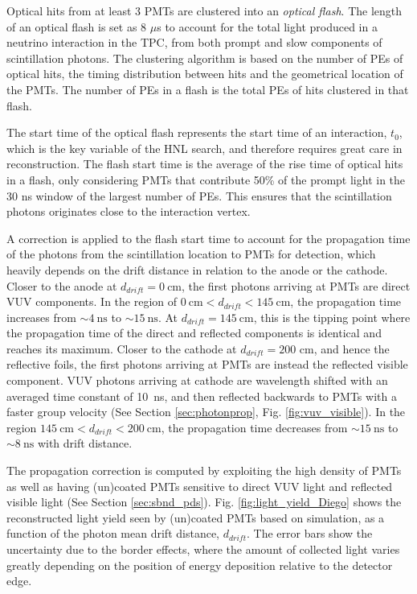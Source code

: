 Optical hits from at least 3 PMTs are clustered into an \textit{optical flash}.
The length of an optical flash is set as 8 $\mu$s to account for the total light produced in a neutrino interaction in the TPC, from both prompt and slow components of scintillation photons.
The clustering algorithm is based on the number of PEs of optical hits, the timing distribution between hits and the geometrical location of the PMTs.
The number of PEs in a flash is the total PEs of hits clustered in that flash. 

The start time of the optical flash represents the start time of an interaction, $t_0$, which is the key variable of the HNL search, and therefore requires great care in reconstruction.
The flash start time is the average of the rise time of optical hits in a flash, only considering PMTs that contribute 50\% of the prompt light in the 30 ns window of the largest number of PEs.
This ensures that the scintillation photons originates close to the interaction vertex.

A correction is applied to the flash start time to account for the propagation time of the photons from the scintillation location to PMTs for detection, which heavily depends on the drift distance in relation to the anode or the cathode.
Closer to the anode at $d_{drift} = 0~\mathrm{cm}$, the first photons arriving at PMTs are direct VUV components.
In the region of $0~\mathrm{cm} < d_{drift} < 145~\mathrm{cm}$, the propagation time increases from $\sim4~\mathrm{ns}$ to $\sim15~\mathrm{ns}$.
At $d_{drift} = 145~\mathrm{cm}$, this is the tipping point where the propagation time of the direct and reflected components is identical and reaches its maximum.
Closer to the cathode at $d_{drift} = 200 $ cm, and hence the reflective foils, the first photons arriving at PMTs are instead the reflected visible component.
VUV photons arriving at cathode are wavelength shifted with an averaged time constant of 10~ns, and then reflected backwards to PMTs with a faster group velocity (See Section \ref{sec:photonprop}, Fig. \ref{fig:vuv_visible}).
In the region $145~\mathrm{cm} < d_{drift} < 200~\mathrm{cm}$, the propagation time decreases from $\sim15~\mathrm{ns}$ to $\sim8~\mathrm{ns}$ with drift distance.

The propagation correction is computed by exploiting the high density of PMTs as well as having (un)coated PMTs sensitive to direct VUV light and reflected visible light (See Section \ref{sec:sbnd_pds}).
Fig. \ref{fig:light_yield_Diego} shows the reconstructed light yield seen by (un)coated PMTs based on simulation, as a function of the photon mean drift distance, $d_{drift}$.
The error bars show the uncertainty due to the border effects, where the amount of collected light varies greatly depending on the position of energy deposition relative to the detector edge.

